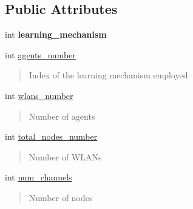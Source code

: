 \subsection*{Public Attributes}
\begin{DoxyCompactItemize}
\item 
\mbox{\label{classMlModel_ac7cb74d76e218c110e1f3ce2e5deefd6}} 
int {\bfseries learning\+\_\+mechanism}
\item 
\mbox{\label{classMlModel_a7d8ffc19c56910599e73ad05f8e09dd1}} 
int \hyperlink{classMlModel_a7d8ffc19c56910599e73ad05f8e09dd1}{agents\+\_\+number}
\begin{DoxyCompactList}\small\item\em \begin{quote}
Index of the learning mechanism employed \end{quote}
\end{DoxyCompactList}\item 
\mbox{\label{classMlModel_a257f8657ded84ed7ca81b4d3ca8372dd}} 
int \hyperlink{classMlModel_a257f8657ded84ed7ca81b4d3ca8372dd}{wlans\+\_\+number}
\begin{DoxyCompactList}\small\item\em \begin{quote}
Number of agents \end{quote}
\end{DoxyCompactList}\item 
\mbox{\label{classMlModel_a24e95021ab99aae6e8759e33e7e81ff4}} 
int \hyperlink{classMlModel_a24e95021ab99aae6e8759e33e7e81ff4}{total\+\_\+nodes\+\_\+number}
\begin{DoxyCompactList}\small\item\em \begin{quote}
Number of W\+L\+A\+Ns \end{quote}
\end{DoxyCompactList}\item 
\mbox{\label{classMlModel_a22c7d2da393a2c6570f98ed9fdf021d5}} 
int \hyperlink{classMlModel_a22c7d2da393a2c6570f98ed9fdf021d5}{num\+\_\+channels}
\begin{DoxyCompactList}\small\item\em \begin{quote}
Number of nodes \end{quote}

\end{DoxyCompactList}
\end{DoxyCompactItemize}
